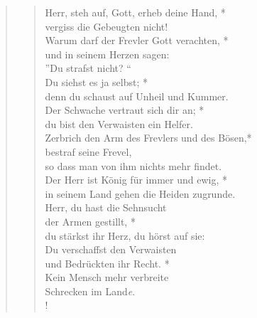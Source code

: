 \begin{quote}
\begin{verse}


Herr, steh auf, Gott, erheb deine Hand, *\\
vergiss die Gebeugten nicht!\\
\vin Warum darf der Frevler Gott verachten, *\\
\vin und in seinem Herzen sagen:\\ 
\vin ''Du strafst nicht? ``\\
Du siehst es ja selbst; *\\
denn du schaust auf Unheil und Kummer.\\
\vin Der Schwache vertraut sich dir an; *\\
\vin du bist den Verwaisten ein Helfer.\\
Zerbrich den Arm des Frevlers und des Bösen,*\\
bestraf seine Frevel,\\
so dass man von ihm nichts mehr findet.\\
\vin Der Herr ist König für immer und ewig, *\\
\vin in seinem Land gehen die Heiden zugrunde.\\
Herr, du hast die Sehnsucht\\
der Armen gestillt, *\\
du stärkst ihr Herz, du hörst auf sie:\\
\vin Du verschaffst den Verwaisten\\ 
\vin und Bedrückten ihr Recht. *\\
\vin Kein Mensch mehr verbreite \\ \vin  Schrecken im Land\textit{e}.\\!

\end{verse}
\end{quote}